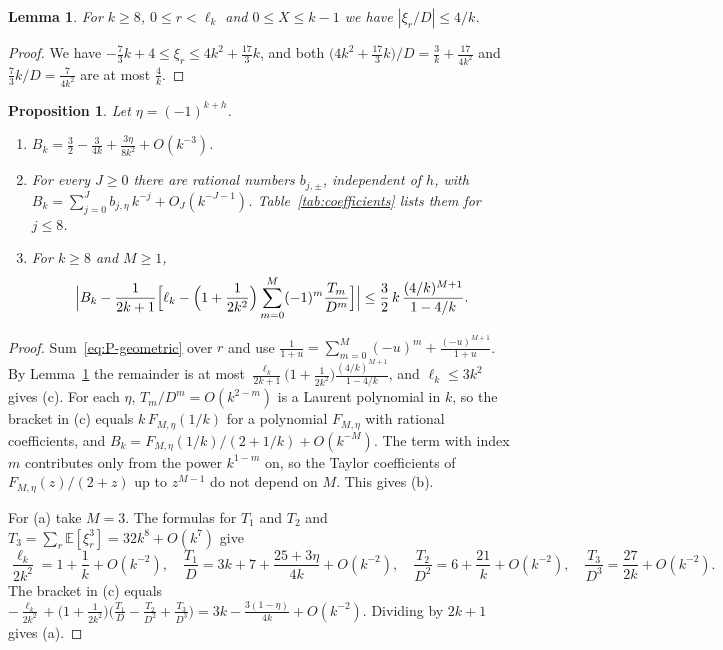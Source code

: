 \documentclass[11pt]{article}
\newtheorem{lemma}[theorem]{Lemma}
\newtheorem{proposition}[theorem]{Proposition}
\theoremstyle{definition}
\theoremstyle{remark}
\newcommand{\E}{\mathbb{E}}
\begin{document}
\begin{lemma}\label{lem:xibound}
For $k\ge8$, $0\le r<\ell_k$ and $0\le X\le k-1$ we have
$|\xi_r/D|\le4/k$.
\end{lemma}

\begin{proof}
We have $-\frac73k+4\le\xi_r\le4k^2+\frac{17}3k$, and both
$\bigl(4k^2+\frac{17}3k\bigr)/D=\frac3k+\frac{17}{4k^2}$ and
$\frac73k/D=\frac7{4k^2}$ are at most $\frac4k$.
\end{proof}

\begin{proposition}\label{prop:expansion}
Let $\eta=(-1)^{k+h}$.
\begin{enumerate}
\item[(a)] $B_k=\frac32-\frac3{4k}+\frac{3\eta}{8k^2}+O(k^{-3})$.
\item[(b)] For every $J\ge0$ there are rational numbers $b_{j,\pm}$,
independent of $h$, with
$B_k=\sum_{j=0}^{J}b_{j,\eta}\,k^{-j}+O_J(k^{-J-1})$.
Table~\ref{tab:coefficients} lists them for $j\le8$.
\item[(c)] For $k\ge8$ and $M\ge1$,
\[
\Bigl|B_k-\frac1{2k+1}\Bigl[\ell_k-\Bigl(1+\frac1{2k^2}\Bigr)
\sum_{m=0}^{M}(-1)^m\frac{T_m}{D^m}\Bigr]\Bigr|
\le\frac32\,k\,\frac{(4/k)^{M+1}}{1-4/k}.
\]
\end{enumerate}
\end{proposition}

\begin{proof}
Sum~\eqref{eq:P-geometric} over $r$ and use
$\frac1{1+u}=\sum_{m=0}^{M}(-u)^m+\frac{(-u)^{M+1}}{1+u}$. By
Lemma~\ref{lem:xibound} the remainder is at most
$\frac{\ell_k}{2k+1}\bigl(1+\frac1{2k^2}\bigr)\frac{(4/k)^{M+1}}{1-4/k}$,
and $\ell_k\le3k^2$ gives (c). For each $\eta$,
$T_m/D^m=O(k^{2-m})$ is a Laurent polynomial in $k$, so the bracket in
(c) equals $k\,F_{M,\eta}(1/k)$ for a polynomial $F_{M,\eta}$ with
rational coefficients, and $B_k=F_{M,\eta}(1/k)/(2+1/k)+O(k^{-M})$. The
term with index $m$ contributes only from the power $k^{1-m}$ on, so the
Taylor coefficients of $F_{M,\eta}(z)/(2+z)$ up to $z^{M-1}$ do not
depend on $M$. This gives (b).

For (a) take $M=3$. The formulas for $T_1$ and $T_2$ and
$T_3=\sum_r\E[\xi_r^3]=32k^8+O(k^7)$ give
\[
\frac{\ell_k}{2k^2}=1+\frac1k+O(k^{-2}),\quad
\frac{T_1}D=3k+7+\frac{25+3\eta}{4k}+O(k^{-2}),\quad
\frac{T_2}{D^2}=6+\frac{21}k+O(k^{-2}),\quad
\frac{T_3}{D^3}=\frac{27}{2k}+O(k^{-2}).
\]
The bracket in (c) equals
$-\frac{\ell_k}{2k^2}+\bigl(1+\frac1{2k^2}\bigr)\bigl(\frac{T_1}D-\frac{T_2}{D^2}
+\frac{T_3}{D^3}\bigr)=3k-\frac{3(1-\eta)}{4k}+O(k^{-2})$.
Dividing by $2k+1$ gives (a).
\end{proof}
\end{document}
